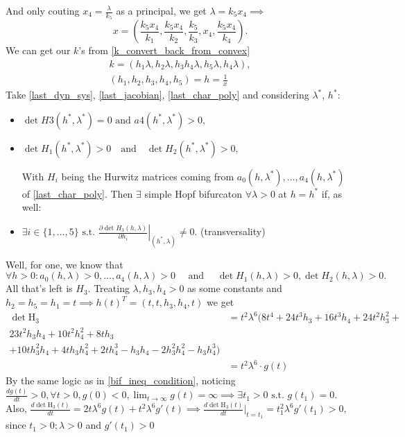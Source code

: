 And only couting $x_4 = \frac{\lambda}{k_5}$ as a principal, we get $\lambda = k_5 x_4 \implies$
\begin{equation}\label{last_char_poly}
	x =
	\left(\frac{k_5x_4}{k_1},\frac{k_5x_4}{k_2},\frac{k_5}{k_3},x_4,\frac{k_5x_4}{k_4}\right).	
\end{equation}
We can get our $k$'s from \ref{k_convert_back_from_convex}
\begin{gather*}
	k =
	\left(h_1 \lambda, h_2 \lambda, h_3 h_4 \lambda, h_5 \lambda, h_4 \lambda\right), \\
	\left(h_1, h_2, h_3, h_4, h_5\right)
	= h = \frac{1}{x}
\end{gather*}
Take \ref{last_dyn_sys}, \ref{last_jacobian}, \ref{last_char_poly} and considering $\lambda^*$, $h^* :$
\begin{itemize}
	\item {} $\det H3(h^*, \lambda^*) = 0 \text{ and } a4(h^*, \lambda^*) > 0,$
	\item {} $\det H_1(h^*,\lambda^*)>0\quad\mathrm{and}\quad\det H_2(h^*,\lambda^*)>0,$

		With $H_i$ being the Hurwitz matrices coming from $a_0(h,\lambda^*), \ldots, a_4(h, \lambda^*)$ of \ref{last_char_poly}.
		Then $\exists$ simple Hopf bifurcaton $\forall \lambda>0$ at $h = h^*$ if, as well:

	\item {} $\exists i\in\{1,\ldots,5\}\text{ s.t. }\left.\frac{\partial\det H_3(h,\lambda)}{\partial h_i}\right|_{(h^*,\lambda)}\neq0.$ (transversality)
\end{itemize}

Well, for one, we know that
\[
	\forall h > 0 : a_{0}(h,\lambda)>0,\ldots,a_{4}(h,\lambda)>0\quad \text{ and } \quad\det H_{1}(h,\lambda)>0,\det H_{2}(h,\lambda)>0.
\]
All that's left is $H_3$. Treating $\lambda, h_3, h_4 > 0$ as some constants and $h_2 = h_5 = h_1 = t \implies h(t)^T = (t,t,h_3,h_4,t)$ we get
\begin{align*}
	\det \text{H}_3 &=
	t^2 \lambda^6
	(
		8t^4 + 24t^3h_3 + 16t^3h_4 + 24t^2h_3^2 + \\
		23t^2h_3h_4+ 10t^2h_4^2 + 8th_3 \\
		+ 10th_3^2h_4 + 4th_3h_4^2 +
		2th_4^3 - h_3h_4 - 2h_3^2h_4^2 - h_3h_4^3
	) \\
	&= 	t^2 \lambda^6 \cdot g(t)
\end{align*}
By the same logic as in \ref{bif_ineq_condition}, noticing $\frac{ d g(t) }{dt} > 0, \forall t > 0,  g(0) < 0, \lim_{t \rightarrow \infty}  g(t) = \infty \implies \exists t_1 > 0 \text{ s.t. }  g(t_1) = 0$.
Also, $\frac{d  \det \text{H}_3(t) }{dt} = 2 t \lambda^6 g(t) + t^2 \lambda^6 g'(t) \implies \frac{d  \det \text{H}_3(t) }{dt} |_{t = t_1}  = t_1^2 \lambda^6 g'(t_1) > 0,$ since $t_1 > 0; \lambda > 0$ and $g'(t_1) > 0$

